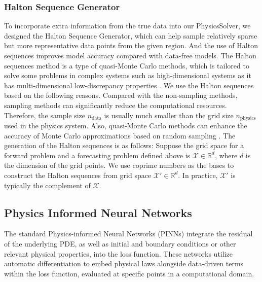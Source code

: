 \documentclass[preprint,11pt]{elsarticle}
\begin{document}
\subsubsection{Halton Sequence Generator}
To incorporate extra information from the true data into our PhysicsSolver, we designed the Halton Sequence Generator, which can help sample relatively sparse but more representative data points from the given region. And the use of Halton sequences improves model accuracy compared with data-free models. The Halton sequences method is a type of quasi-Monte Carlo methods, which is tailored to solve some problems in complex systems such as high-dimensional systems as it has multi-dimensional low-discrepancy properties \cite{caflisch1998monte,wang2000randomized}. 
We use the Halton sequences based on the following reasons. Compared with the non-sampling methods, sampling methods can significantly reduce the computational resources. Therefore, the sample size $n_{\text{data}}$ is usually much smaller than the grid size $n_{\text{physics}}$ used in the physics system. Also, quasi-Monte Carlo methods can enhance the accuracy of Monte Carlo approximations based on random sampling \cite{jank2005quasi,shapiro2003monte}.
The generation of the Halton sequences is as follows: Suppose the grid space for a forward problem and a forecasting problem defined above is $\mathcal{X} \in \mathbb{R}^d$, where $d$ is the dimension of the grid points. We use coprime numbers as the bases to construct the Halton sequences from grid space $\mathcal{X'} \in \mathbb{R}^d$. In practice, $\mathcal{X'}$ is typically the complement of $\mathcal{X}$. 


\subsection{Physics Informed Neural Networks}
The standard Physics-informed Neural Networks (PINNs) \cite{raissi2019physics} integrate the residual of the underlying PDE, as well as initial and boundary conditions or other relevant physical properties, into the loss function. These networks utilize automatic differentiation to embed physical laws alongside data-driven terms within the loss function, evaluated at specific points in a computational domain.
\end{document}

